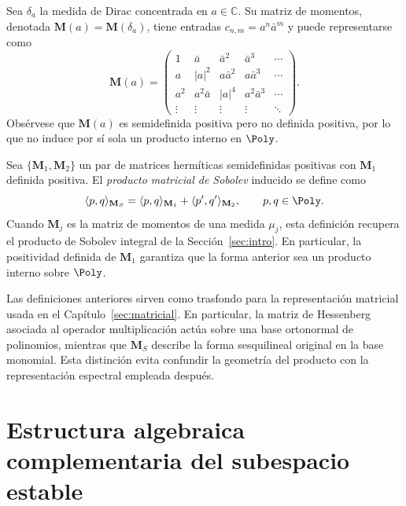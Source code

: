 \begin{defn}\label{def:matriz_dirac}
	Sea $\delta_a$ la medida de Dirac concentrada en $a \in \mathbb{C}$. Su matriz de momentos, denotada $\mathbf{M}(a) = \mathbf{M}(\delta_a)$, tiene entradas $c_{n,m} = a^n \bar{a}^m$ y puede representarse como
	\[
		\mathbf{M}(a) = \begin{pmatrix}
			1      & \bar{a}    & \bar{a}^2  & \bar{a}^3    & \cdots \\
			a      & |a|^2      & a\bar{a}^2 & a\bar{a}^3   & \cdots \\
			a^2    & a^2\bar{a} & |a|^4      & a^2\bar{a}^3 & \cdots \\
			\vdots & \vdots     & \vdots     & \vdots       & \ddots
		\end{pmatrix}.
	\]
	Obsérvese que $\mathbf{M}(a)$ es semidefinida positiva pero no definida positiva, por lo que no induce por sí sola un producto interno en $\Poly$.
\end{defn}

\begin{defn}\label{def:producto_sobolev_matricial}
	Sea $\{\mathbf{M}_1, \mathbf{M}_2\}$ un par de matrices hermíticas semidefinidas positivas con $\mathbf{M}_1$ definida positiva. El \emph{producto matricial de Sobolev} inducido se define como
	\[
		\langle p, q \rangle_{\mathbf{M}_S} = \langle p, q \rangle_{\mathbf{M}_1} + \langle p', q' \rangle_{\mathbf{M}_2}, \qquad p, q \in \Poly.
	\]
	Cuando $\mathbf{M}_j$ es la matriz de momentos de una medida $\mu_j$, esta definición recupera el producto de Sobolev integral de la Sección~\ref{sec:intro}. En particular, la positividad definida de $\mathbf{M}_1$ garantiza que la forma anterior sea un producto interno sobre $\Poly$.
\end{defn}

\begin{rmk}
	Las definiciones anteriores sirven como trasfondo para la representación matricial usada en el Capítulo~\ref{sec:matricial}. En particular, la matriz de Hessenberg asociada al operador multiplicación actúa sobre una base ortonormal de polinomios, mientras que $\mathbf{M}_S$ describe la forma sesquilineal original en la base monomial. Esta distinción evita confundir la geometría del producto con la representación espectral empleada después.
\end{rmk}

\section{Estructura algebraica complementaria del subespacio estable}\label{ap:estructura_algebraica_vout}

